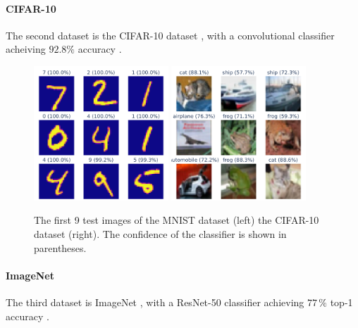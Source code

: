 \documentclass[]{scrarticle}
\begin{document}
\paragraph{CIFAR-10}
The second dataset is the CIFAR-10 dataset \cite{Krizhevsky2009LearningML},
with a convolutional classifier acheiving $92.8 \%$ accuracy \cite{999912022cifar10fastsimple}.

\begin{figure}[h]
  \centering
  \includegraphics[width=0.45\textwidth]{../images/sample_MNIST.png}
  \includegraphics[width=0.45\textwidth]{../images/sample_CIFAR10.png}
  \caption{
    The first 9 test images of
    the MNIST dataset (left)
    the CIFAR-10 dataset (right).
    The confidence of the classifier is shown in parentheses.}
  \label{fig:mnist_cifar10_samples}
\end{figure}


\paragraph{ImageNet}
The third dataset is ImageNet \cite{Deng2009ImageNetAL}, with a ResNet-50 classifier
achieving $77\,\%$ top-1 accuracy \cite{He2015DeepRL}.
\end{document}
